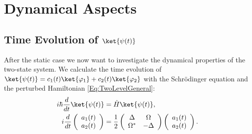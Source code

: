 \section{Dynamical Aspects}
\subsection{Time Evolution of $\ket{\psi(t)}$}
 After the static case we now want to investigate the dynamical properties of the two-state system. We calculate the time evolution of $\ket{\psi(t)} = c_1(t)\ket{\varphi_1} + c_2(t)\ket{\varphi_2}$ with the Schrödinger equation and the perturbed Hamiltonian \eqref{Eq:TwoLevelGeneral}:
\begin{align}
i\hbar \frac{d}{dt}\ket{\psi(t)}&=\hat{H}\ket{\psi(t)},\\
i \frac{d}{dt}\left(\begin{array}{c} a_1(t) \\ a_2(t) \end{array}\right) &= \frac{1}{2}\left( \begin{array}{cc} \Delta & \Omega \\ \Omega^* & -\Delta \end{array} \right) \left(\begin{array}{c} a_1(t) \\ a_2(t) \end{array} \right).
\end{align}

